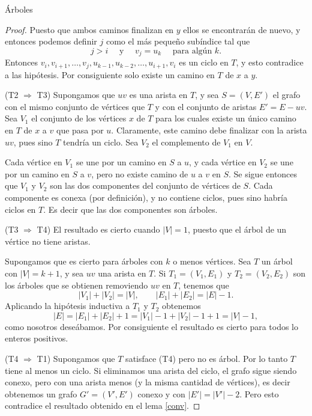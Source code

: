 \begin{section}{Árboles}
\begin{proof}
Puesto que ambos caminos finalizan en $y$ ellos se encontrarán de nuevo, y entonces podemos definir $j$ como el más pequeño subíndice tal que
$$
j>i \quad \text{ y } \quad v_j=u_k \quad \text{ para algún } k.
$$
Entonces $v_i,v_{i+1},\ldots,v_j,u_{k-1},u_{k-2},\ldots,u_{i+1},v_i$ es un ciclo en $T$, y esto contradice a las hipótesis. Por consiguiente solo existe un camino en $T$ de $x$ a $y$.


\noindent (T2 $\Rightarrow$ T3) Supongamos que $uv$ es una arista en $T$, y sea $S=(V,E')$ el grafo con el mismo conjunto de vértices que $T$ y con el conjunto de aristas $E'=E-uv$. Sea $V_1$ el conjunto de los vértices $x$ de $T$ para los cuales existe un único camino en $T$ de $x$ a $v$ que pasa por $u$. Claramente, este camino debe finalizar con la arista $uv$, pues sino $T$ tendría un ciclo. Sea $V_2$ el complemento de
$V_1$ en $V$.

Cada vértice en $V_1$ se une por un camino en $S$ a $u$, y cada vértice en $V_2$ se une por un camino en $S$ a $v$, pero no existe camino de $u$ a $v$ en $S$. Se sigue entonces que $V_1$ y $V_2$ son las dos componentes del conjunto de vértices de $S$. Cada componente es conexa (por definición), y no contiene ciclos, pues sino habría ciclos en $T$. Es decir que las dos componentes son árboles.


\noindent(T3 $\Rightarrow$ T4) El resultado es cierto cuando $|V|=1$, puesto que el árbol de un vértice no tiene aristas.

Supongamos que es cierto para árboles con $k$ o menos vértices. Sea $T$ un árbol con $|V|=k+1$, y sea $uv$ una arista en $T$. Si $T_1=(V_1,E_1)$ y $T_2=(V_2,E_2)$ son los árboles que se obtienen removiendo $uv$ en $T$, tenemos que 
$$
|V_1| + |V_2| = |V|, \qquad |E_1| + |E_2| = |E|-1.
$$
Aplicando la hipótesis inductiva a $T_1$ y $T_2$ obtenemos
$$
|E|=|E_1| + |E_2| + 1 = |V_1|-1 +|V_2|-1+1= |V| -1,
$$
como nosotros deseábamos. Por consiguiente el resultado es cierto para todos lo enteros positivos.

\noindent (T4 $\Rightarrow$ T1) Supongamos que $T$ satisface (T4) pero no es árbol. Por lo tanto $T$ tiene al menos un ciclo. Si eliminamos una arista del ciclo, el grafo sigue siendo conexo, pero con una arista menos (y la misma cantidad de vértices), es decir obtenemos un grafo $G' = (V',E')$  conexo y con $|E'| = |V'|-2$. Pero esto contradice el resultado obtenido en el lema \ref{conv}.    
\end{proof}


\end{section}
